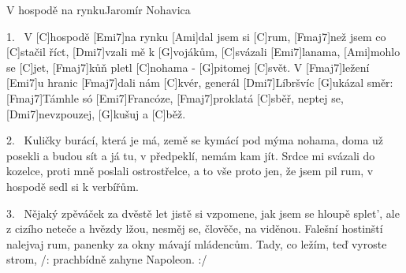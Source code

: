 \begin{song}{V hospodě na rynku}{Jaromír Nohavica}

\begin{xverse}{1.~}
V [\large C]hospodě [\large Emi7]na rynku [\large Ami]dal jsem si [\large C]rum,
[\large Fmaj7]než jsem co [\large C]stačil říct, [\large Dmi7]vzali mě k [\large G]vojákům,
[\large C]svázali [\large Emi7]lanama, [\large Ami]mohlo se [\large C]jet,
[\large Fmaj7]kůň pletl [\large C]nohama - [\large G]pitomej [\large C]svět.
V [\large Fmaj7]ležení [\large Emi7]u hranic [\large Fmaj7]dali nám [\large C]kvér,
generál [\large Dmi7]Líbršvíc [\large G]ukázal směr:
[\large Fmaj7]Támhle só [\large Emi7]Francóze, [\large Fmaj7]proklatá [\large C]sběř,
neptej se, [\large Dmi7]nevzpouzej, [\large G]kušuj a [\large C]běž.
\end{xverse}

\begin{xverse}{2.~}
Kuličky burácí, která je má,
země se kymácí pod mýma nohama,
doma už posekli a budou sít
a já tu, v předpeklí, nemám kam jít.
Srdce mi svázali do kozelce,
proti mně poslali ostrostřelce,
a to vše proto jen, že jsem pil rum,
v hospodě sedl si k verbířům.
\end{xverse}

\begin{xverse}{3.~}
Nějaký zpěváček za dvěstě let
jistě si vzpomene, jak jsem se hloupě splet',
ale z cizího neteče a hvězdy lžou,
nesměj se, člověče, na viděnou.
Falešní hostinští nalejvaj rum,
panenky za okny mávají mládencům.
Tady, co ležím, teď vyroste strom,
/: prachbídně zahyne Napoleon. :/
\end{xverse}
\end{song}

